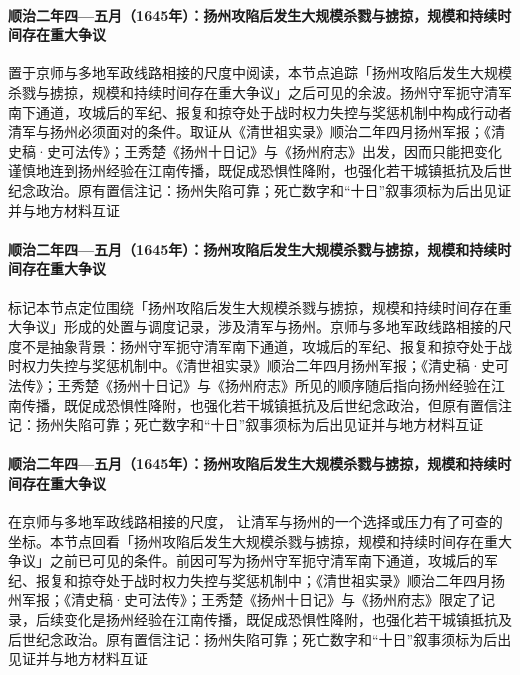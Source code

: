 \paragraph{顺治二年四—五月（1645年）：扬州攻陷后发生大规模杀戮与掳掠，规模和持续时间存在重大争议}
 置于京师与多地军政线路相接的尺度中阅读，本节点追踪「扬州攻陷后发生大规模杀戮与掳掠，规模和持续时间存在重大争议」之后可见的余波。扬州守军扼守清军南下通道，攻城后的军纪、报复和掠夺处于战时权力失控与奖惩机制中构成行动者清军与扬州必须面对的条件。取证从《清世祖实录》顺治二年四月扬州军报；《清史稿·史可法传》；王秀楚《扬州十日记》与《扬州府志》出发，因而只能把变化谨慎地连到扬州经验在江南传播，既促成恐惧性降附，也强化若干城镇抵抗及后世纪念政治。原有置信注记：扬州失陷可靠；死亡数字和“十日”叙事须标为后出见证并与地方材料互证

\paragraph{顺治二年四—五月（1645年）：扬州攻陷后发生大规模杀戮与掳掠，规模和持续时间存在重大争议}
 标记本节点定位围绕「扬州攻陷后发生大规模杀戮与掳掠，规模和持续时间存在重大争议」形成的处置与调度记录，涉及清军与扬州。京师与多地军政线路相接的尺度不是抽象背景：扬州守军扼守清军南下通道，攻城后的军纪、报复和掠夺处于战时权力失控与奖惩机制中。《清世祖实录》顺治二年四月扬州军报；《清史稿·史可法传》；王秀楚《扬州十日记》与《扬州府志》所见的顺序随后指向扬州经验在江南传播，既促成恐惧性降附，也强化若干城镇抵抗及后世纪念政治，但原有置信注记：扬州失陷可靠；死亡数字和“十日”叙事须标为后出见证并与地方材料互证

\paragraph{顺治二年四—五月（1645年）：扬州攻陷后发生大规模杀戮与掳掠，规模和持续时间存在重大争议}
在京师与多地军政线路相接的尺度， 让清军与扬州的一个选择或压力有了可查的坐标。本节点回看「扬州攻陷后发生大规模杀戮与掳掠，规模和持续时间存在重大争议」之前已可见的条件。前因可写为扬州守军扼守清军南下通道，攻城后的军纪、报复和掠夺处于战时权力失控与奖惩机制中；《清世祖实录》顺治二年四月扬州军报；《清史稿·史可法传》；王秀楚《扬州十日记》与《扬州府志》限定了记录，后续变化是扬州经验在江南传播，既促成恐惧性降附，也强化若干城镇抵抗及后世纪念政治。原有置信注记：扬州失陷可靠；死亡数字和“十日”叙事须标为后出见证并与地方材料互证

